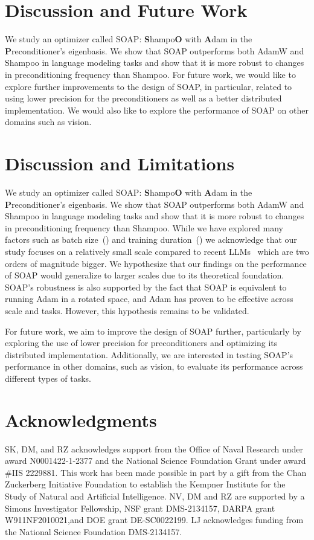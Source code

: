 \documentclass{article}
\begin{document}
\section{Discussion and Future Work}
We study an optimizer called SOAP: \textbf{S}hampo\textbf{O} with \textbf{A}dam in the \textbf{P}reconditioner's eigenbasis. We show that SOAP outperforms both AdamW and Shampoo in language modeling tasks and show that it is more robust to changes in preconditioning frequency than Shampoo. For future work, we would like to explore further improvements to the design of SOAP, in particular, related to using lower precision for the preconditioners as well as a better distributed implementation. We would also like to explore the performance of SOAP on other domains such as vision.

\section{Discussion and Limitations}
We study an optimizer called SOAP: \textbf{S}hampo\textbf{O} with \textbf{A}dam in the \textbf{P}reconditioner's eigenbasis. We show that SOAP outperforms both AdamW and Shampoo in language modeling tasks and show that it is more robust to changes in preconditioning frequency than Shampoo. While we have explored many factors such as batch size~() and training duration~() we acknowledge that our study focuses on a relatively small scale compared to recent LLMs~\cite{llama} which are two orders of magnitude bigger. We hypothesize that our findings on the performance of SOAP would generalize to larger scales due to its theoretical foundation. SOAP's robustness is also supported by the fact that SOAP is equivalent to running Adam in a rotated space, and Adam has proven to be effective across scale and tasks. However, this hypothesis remains to be validated. 

For future work, we aim to improve the design of SOAP further, particularly by exploring the use of lower precision for preconditioners and optimizing its distributed implementation. Additionally, we are interested in testing SOAP’s performance in other domains, such as vision, to evaluate its performance across different types of tasks.

\section*{Acknowledgments}

SK, DM, and RZ acknowledges support from the Office of Naval Research under award N0001422-1-2377 and the National Science Foundation Grant under award \#IIS 2229881. This work has been made possible in part by a gift from the Chan Zuckerberg Initiative Foundation to establish the
Kempner Institute for the Study of Natural and Artificial Intelligence. NV, DM and RZ are supported
by a Simons Investigator Fellowship, NSF grant DMS-2134157, DARPA grant W911NF2010021,and
DOE grant DE-SC0022199. LJ acknowledges funding from the National Science Foundation
DMS-2134157.
\end{document}
